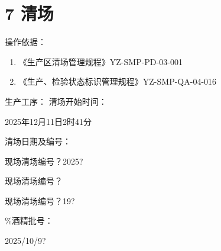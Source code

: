 \documentclass[UTF8,10pt,a4paper,fontset=fandol]{ctexart}
\newcommand{\fieldvalue}[1]{#1}
\newcommand{\handwritten}[1]{#1}
\begin{document}
\section*{7 清场}

\noindent 操作依据：

\begin{enumerate}
\item 《生产区清场管理规程》\hfill YZ-SMP-PD-03-001
\item 《生产、检验状态标识管理规程》\hfill YZ-SMP-QA-04-016
\end{enumerate}

\noindent
生产工序：\underline{\hspace{4cm}} \qquad 清场开始时间：

\fieldvalue{\handwritten{2025年12月11日2时41分}}

\noindent
清场日期及编号：

\fieldvalue{\handwritten{现场清场编号？2025?}}

\fieldvalue{\handwritten{现场清场编号？}}

\fieldvalue{\handwritten{现场清场编号？19?}}

\%酒精批号：

\fieldvalue{\handwritten{2025/10/9?}}
\end{document}
